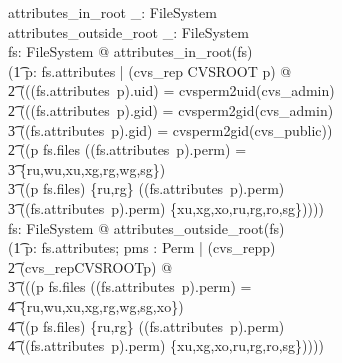 \begin{axdef}
  attributes\_in\_root \_: \power FileSystem \\
  attributes\_outside\_root \_: \power FileSystem \\
  \where
  \forall fs: FileSystem @ attributes\_in\_root(fs) \iff \\
  (\t1 \forall p: \dom fs.attributes | (cvs\_rep \cat \langle CVSROOT \rangle
  \prefix p) @ \\ 
  \t2 (((fs.attributes~p).uid) = cvsperm2uid(cvs\_admin) \land \\
  \t2 (((fs.attributes~p).gid) = cvsperm2gid(cvs\_admin) \lor \\
  \t3 ((fs.attributes~p).gid) = cvsperm2gid(cvs\_public)) \land \\
  \t2 ((p \isdirin fs.files \land ((fs.attributes~p).perm) = \\
  \t3 \{ru,wu,xu,xg,rg,wg,sg\}) \lor \\  
  \t3 (\lnot(p \isdirin fs.files) \land \{ru,rg\} \subseteq
  ((fs.attributes~p).perm) \\ 
  \t3 \land ((fs.attributes~p).perm) \subseteq \{xu,xg,xo,ru,rg,ro,sg\})))) \\

  \forall fs: FileSystem @ attributes\_outside\_root(fs) \iff \\
  (\t1 \forall p: \dom fs.attributes; pms : \power Perm | (cvs\_rep\prefix p)
  \land \\ 
  \t2 \lnot (cvs\_rep\cat\langle CVSROOT\rangle\prefix p) @ \\
  \t3 (((p \isdirin fs.files \land ((fs.attributes~p).perm) = \\
  \t4 \{ru,wu,xu,xg,rg,wg,sg,xo\}) \\
  \t4 \lor ((p \isdirin fs.files) \land \{ru,rg\} \subseteq
  ((fs.attributes~p).perm) \\ 
  \t4 \land ((fs.attributes~p).perm) \subseteq \{xu,xg,xo,ru,rg,ro,sg\})))) \\
\end{axdef}

